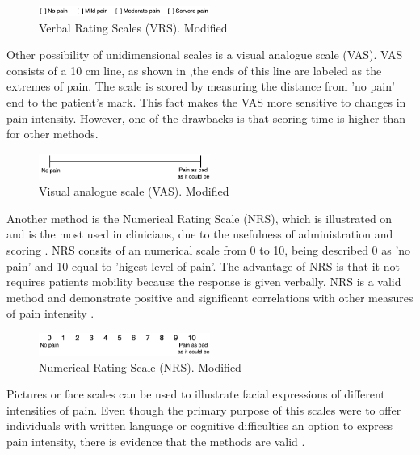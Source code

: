 \begin{figure}[H]
	\includegraphics[width=0.5\textwidth]{figures/VRS.png} 
	\caption{Verbal Rating Scales (VRS). Modified~\cite{Jensen2001}}
	\label{fig:VRS}  
\end{figure}   

Other possibility of unidimensional scales is a visual analogue scale (VAS). VAS consists of a 10 cm line, as shown in ,the ends of this line are labeled as the extremes of pain. The scale is scored by measuring the distance from 'no pain' end to the patient's mark. This fact makes the VAS more sensitive to changes in pain intensity. However, one of the drawbacks is that scoring time is higher than for other methods.~\cite{Jensen2001} 

\begin{figure}[H]
	\includegraphics[width=0.5\textwidth]{figures/VAS.png} 
	\caption{Visual analogue scale (VAS). Modified~\cite{Jensen2001}}
	\label{fig:VAS}  
\end{figure}   

Another method is the Numerical Rating Scale (NRS), which is illustrated on  and is the most used in clinicians, due to the usefulness of administration and scoring  \cite{Fillingim2016}. NRS consits of an numerical scale from 0 to 10, being described 0 as 'no pain' and  10 equal to 'higest level of pain'. The advantage of NRS is that it not requires patients mobility because the response is given verbally. NRS is a valid method and demonstrate positive and significant correlations with other measures of pain intensity \cite{Jensen2001}. 

\begin{figure}[H]
	\includegraphics[width=0.5\textwidth]{figures/NRS.png} 
	\caption{Numerical Rating Scale (NRS). Modified~\cite{Jensen2001}}
	\label{fig:NRS}  
\end{figure}   

Pictures or face scales can be used to illustrate facial expressions of different intensities of pain. Even though the primary purpose of this scales were to offer individuals with written language or cognitive difficulties an option to express pain intensity, there is evidence that the methods are valid \cite{Jensen2001}. 


